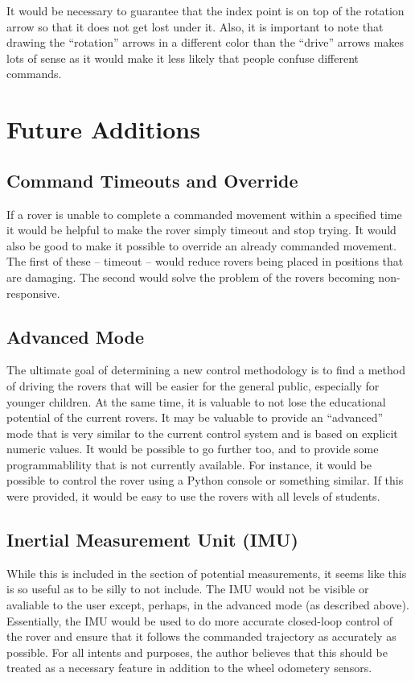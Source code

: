 \documentclass[letterpaper,10pt]{article}
\begin{document}
    It would be necessary to guarantee that the index point is on top of the rotation arrow so that it does not get lost under it.  Also, it is important to note that drawing the ``rotation'' arrows in a different color than the ``drive'' arrows makes lots of sense as it would make it less likely that people confuse different commands.
  
\section{Future Additions}
  \subsection{Command Timeouts and Override}
    If a rover is unable to complete a commanded movement within a specified time it would be helpful to make the rover simply timeout and stop trying.  It would also be good to make it possible to override an already commanded movement.  The first of these -- timeout -- would reduce rovers being placed in positions that are damaging.  The second would solve the problem of the rovers becoming non-responsive.
    
  \subsection{Advanced Mode}
    The ultimate goal of determining a new control methodology is to find a method of driving the rovers that will be easier for the general public, especially for younger children.  At the same time, it is valuable to not lose the educational potential of the current rovers.  It may be valuable to provide an ``advanced'' mode that is very similar to the current control system and is based on explicit numeric values.  It would be possible to go further too, and to provide some programmablility that is not currently available.  For instance, it would be possible to control the rover using a Python console or something similar.  If this were provided, it would be easy to use the rovers with all levels of students.
    
  \subsection{Inertial Measurement Unit (IMU)}
    While this is included in the section of potential measurements, it seems like this is so useful as to be silly to not include.  The IMU would not be visible or avaliable to the user except, perhaps, in the advanced mode (as described above).  Essentially, the IMU would be used to do more accurate closed-loop control of the rover and ensure that it follows the commanded trajectory as accurately as possible.  For all intents and purposes, the author believes that this should be treated as a necessary feature in addition to the wheel odometery sensors.
    
\end{document}
